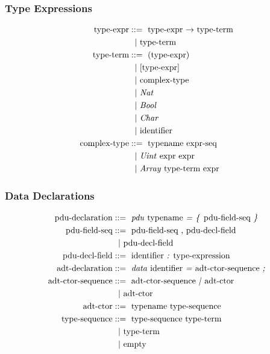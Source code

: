 \subsubsection{Type Expressions}

\begin{align*}
  \textnormal{type-expr} &::=~
    \textnormal{type-expr $\rightarrow$ type-term}\\
    &~~|~ \textnormal{type-term}\\
  \textnormal{type-term} &::=~
    \textnormal{(type-expr)}\\
    &~~|~ \textnormal{[type-expr]}\\
    &~~|~ \textnormal{complex-type}\\
    &~~|~ \textnormal{\emph{Nat}}\\
    &~~|~ \textnormal{\emph{Bool}}\\
    &~~|~ \textnormal{\emph{Char}}\\
    &~~|~ \textnormal{identifier}\\
  \textnormal{complex-type} &::=~
    \textnormal{typename expr-seq} \\
    &~~|~ \textnormal{\emph{Uint} expr expr} \\
    &~~|~ \textnormal{\emph{Array} type-term expr}
\end{align*}

\subsubsection{Data Declarations}

\begin{align*}
  \textnormal{pdu-declaration} &::=~
    \textnormal{\emph{pdu} typename \emph{=} \emph{\{} pdu-field-seq \emph{\}}}\\
  \textnormal{pdu-field-seq} &::=~
    \textnormal{pdu-field-seq , pdu-decl-field}\\
    &~~|~ \textnormal{pdu-decl-field}\\
  \textnormal{pdu-decl-field} &::=~
    \textnormal{identifier \emph{:} type-expression}\\
  \textnormal{adt-declaration} &::=~
    \textnormal{\emph{data} identifier \emph{=} adt-ctor-sequence \emph{;}}\\
  \textnormal{adt-ctor-sequence} &::=~
    \textnormal{adt-ctor-sequence \emph{|} adt-ctor}\\
    &~~|~ \textnormal{adt-ctor}\\
  \textnormal{adt-ctor} &::=~
    \textnormal{typename type-sequence}\\
  \textnormal{type-sequence} &::=~
    \textnormal{type-sequence type-term}\\
    &~~|~ \textnormal{type-term}\\
    &~~|~ \textnormal{empty}
\end{align*}

